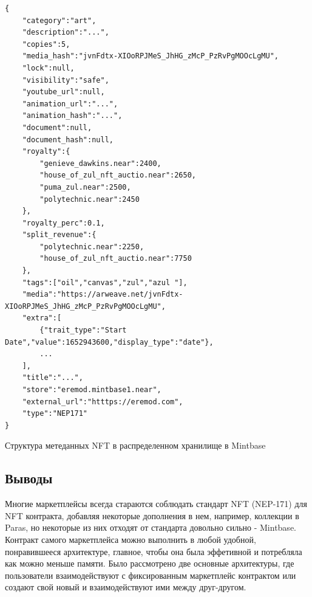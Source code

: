 \begin{listing}
\begin{verbatim}
{
    "category":"art",
    "description":"...",
    "copies":5,
    "media_hash":"jvnFdtx-XIOoRPJMeS_JhHG_zMcP_PzRvPgMOOcLgMU",
    "lock":null,
    "visibility":"safe",
    "youtube_url":null,
    "animation_url":"...",
    "animation_hash":"...",
    "document":null,
    "document_hash":null,
    "royalty":{
        "genieve_dawkins.near":2400,
        "house_of_zul_nft_auctio.near":2650,
        "puma_zul.near":2500,
        "polytechnic.near":2450
    },
    "royalty_perc":0.1,
    "split_revenue":{
        "polytechnic.near":2250,
        "house_of_zul_nft_auctio.near":7750
    },
    "tags":["oil","canvas","zul","azul "],
    "media":"https://arweave.net/jvnFdtx-XIOoRPJMeS_JhHG_zMcP_PzRvPgMOOcLgMU",
    "extra":[
        {"trait_type":"Start Date","value":1652943600,"display_type":"date"},
        ...
    ],
    "title":"...",
    "store":"eremod.mintbase1.near",
    "external_url":"htttps://eremod.com",
    "type":"NEP171"
}

\end{verbatim}
\caption{Структура метеданных NFT в распределенном хранилище в Mintbase}
\label{lst.mintbase.nftstructmeta}
\end{listing}

\subsection{Выводы}
Многие маркетплейсы всегда стараются соблюдать стандарт NFT (NEP-171) для NFT контракта, добавляя некоторые дополнения в нем, например, коллекции в  Paras, но некоторые из них отходят от стандарта довольно сильно - Mintbase. Контракт самого маркетплейса можно выполнить в любой удобной, понравившееся архитектуре, главное, чтобы она была эффетивной и потребляла как можно меньше памяти. Было рассмотрено две основные архитектуры, где пользователи взаимодействуют с фиксированным маркетплейс контрактом или создают свой новый и взаимодействуют ими между друг-другом. 
